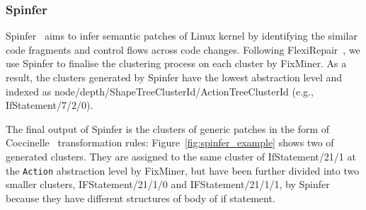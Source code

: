 \documentclass[conference]{IEEEtran}
\begin{document}
\subsubsection{Spinfer}
Spinfer~\cite{serrano2020spinfer} aims to infer semantic patches of Linux kernel
by identifying the similar code fragments and control flows across code changes.
Following FlexiRepair~\cite{koyuncu2020flexirepair}, we use Spinfer to finalise
the clustering process on each cluster by FixMiner. As a result, the clusters
generated by Spinfer have the lowest abstraction level and indexed as
node/depth/ShapeTreeClusterId/ActionTreeClusterId (e.g., IfStatement/7/2/0).

The final output of Spinfer is the clusters of generic patches in the form of 
Coccinelle~\cite{lawall2018coccinelle} transformation rules: 
Figure~\ref{fig:spinfer_example} shows two of generated clusters. They are 
assigned to the same cluster of IfStatement/21/1 at the \texttt{Action} 
abstraction level by FixMiner, but have been further divided into two smaller 
clusters, IFStatement/21/1/0 and IFStatement/21/1/1, by Spinfer because they 
have different structures of body of if statement.
\end{document}
